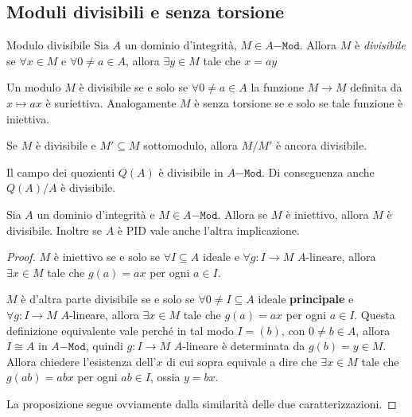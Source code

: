 \subsection{Moduli divisibili e senza torsione}

\begin{definition}{Modulo divisibile}
    Sia \(A\) un dominio d'integrità, \(M \in A\mathtt{-Mod}\). Allora \(M\) è
    \emph{divisibile} se \(\forall x \in M\) e \(\forall 0 \neq a \in A\),
    allora \(\exists y \in M\) tale che \(x = ay\) 
\end{definition}

\begin{remark}{}
    Un modulo \(M\) è divisibile se e solo se \(\forall 0 \neq a \in A\) la
    funzione \(M \to M\) definita da \(x \mapsto ax\) è suriettiva. Analogamente
    \(M\) è senza torsione se e solo se tale funzione è iniettiva.
\end{remark}

\begin{remark}{}
    Se \(M\) è divisibile e \(M' \subseteq M \) sottomodulo, allora \(M / M'\) è
    ancora divisibile.
\end{remark}

\begin{example}{}
    Il campo dei quozienti \(Q{(A)}\) è divisibile in \(A\mathtt{-Mod}\). Di
    conseguenza anche \(Q{(A)} / A\) è divisibile.
\end{example}

\begin{proposition}{}\label{prop:M-inj-div}
    Sia \(A\) un dominio d'integrità e \(M \in A\mathtt{-Mod}\). Allora se \(M\) è
    iniettivo, allora \(M\) è divisibile. Inoltre se \(A\) è PID vale anche
    l'altra implicazione.
\end{proposition}
\begin{proof}{}
    \(M\) è iniettivo se e solo se \(\forall I \subseteq A \) ideale e \(\forall
    g : I \to M\) \(A\)-lineare, allora \(\exists x \in M\) tale che \(g {(a)} =
    ax\) per ogni \(a \in I\).

    \(M\) è d'altra parte divisibile se e solo se \(\forall 0 \neq I \subseteq A
    \) ideale \textbf{principale} e \(\forall g : I \to M\) \(A\)-lineare,
    allora \(\exists x \in M\) tale che \(g{(a)} = ax\) per ogni \(a \in I\).
    Questa definizione equivalente vale perché in tal modo \(I = {(b)}\), con
    \(0 \neq b \in A\), allora \(I \cong A\) in \(A\mathtt{-Mod}\), quindi \(g :
    I \to M\) \(A\)-lineare è determinata da \(g{(b)} = y \in M\). Allora
    chiedere l'esistenza dell'\(x\) di cui sopra equivale a dire che \(\exists x
    \in M\) tale che \(g{(ab)} = abx\) per ogni \(ab \in I\), ossia \(y = bx\).

    La proposizione segue ovviamente dalla similarità delle due
    caratterizzazioni.
\end{proof}

